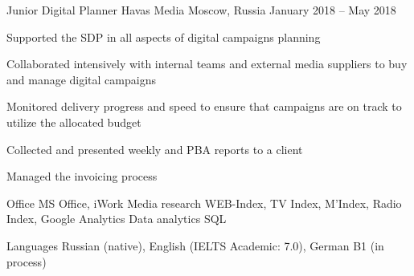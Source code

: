 \documentclass[11pt, a4paper]{awesome-cv}
\begin{document}
\begin{cventries}
\cventry
	{Junior Digital Planner}
	{Havas Media}
	{Moscow, Russia}
	{January 2018 -- May 2018}
	{
		\begin{cvitems}
			\item {Supported the SDP in all aspects of digital campaigns planning}
			\item {Collaborated intensively with internal teams and external media suppliers to buy and manage digital campaigns}
			\item {Monitored delivery progress and speed to ensure that campaigns are on track to utilize the allocated budget}
			\item {Collected and presented weekly and PBA reports to a client}
			\item {Managed the invoicing process}
		\end{cvitems}
	}

\end{cventries}

\begin{cvskills}
	\cvskill
		{Office}
		{MS Office, iWork}
	\cvskill
		{Media research}
		{WEB-Index, TV Index, M’Index, Radio Index, Google Analytics}
	\cvskill
		{Data analytics}
		{SQL}
		
	\cvskill
		{Languages}
		{Russian (native), English (IELTS Academic: 7.0), German B1 (in process)}
\end{cvskills}
\end{document}
